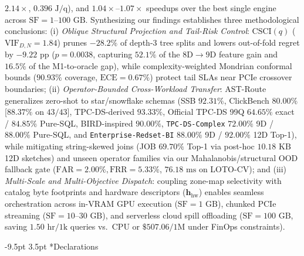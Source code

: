 \documentclass[10pt,a4paper]{article}
\makeatletter
\renewcommand\section{\@startsection{section}{1}{\z@}%
  {-9.5pt \@plus -2pt \@minus -1.5pt}%
  {3.5pt \@plus 1pt}%
  {\normalfont\large\bfseries}}
\makeatother
\begin{document}
$2.14\times$, $0.396\text{ J/q}$), and $1.04\times\text{--}1.07\times$ speedups over the best single engine across $\text{SF}=1\text{--}100\text{ GB}$. Synthesizing our findings establishes three methodological conclusions: (i) \textit{Oblique Structural Projection and Tail-Risk Control}: $\text{CSCI}(q)$ ($\text{VIF}_{D,N}=1.84$) prunes $-28.2\%$ of depth-3 tree splits and lowers out-of-fold regret by $-9.22\text{ pp}$ ($p=0.0038$, capturing $52.1\%$ of the $8\text{D}\rightarrow 9\text{D}$ feature gain and $16.5\%$ of the M1-to-oracle gap), while complexity-weighted Mondrian conformal bounds ($90.93\%$ coverage, $\text{ECE}=0.67\%$) protect tail SLAs near PCIe crossover boundaries; (ii) \textit{Operator-Bounded Cross-Workload Transfer}: AST-Route generalizes zero-shot to star/snowflake schemas (SSB $92.31\%$, ClickBench $80.00\%$ [$88.37\%$ on $43/43$], TPC-DS-derived $93.33\%$, Official TPC-DS 99Q $64.65\%$ exact / $84.85\%$ Pure-SQL, BIRD-inspired $90.00\%$, \texttt{TPC-DS-Complex} $72.00\%$ 9D / $88.00\%$ Pure-SQL, and \texttt{Enterprise-Redset-BI} $88.00\%$ 9D / $92.00\%$ 12D Top-1), while mitigating string-skewed joins (JOB $69.70\%$ Top-1 via post-hoc $10.18\text{ KB}$ 12D sketches) and unseen operator families via our Mahalanobis/structural OOD fallback gate ($\text{FAR}=2.00\%, \text{FRR}=5.33\%$, $76.18\text{ ms}$ on LOTO-CV); and (iii) \textit{Multi-Scale and Multi-Objective Dispatch}: coupling zone-map selectivity with catalog byte footprints and hardware descriptors ($\mathbf{h}_{\text{hw}}$) enables seamless orchestration across in-VRAM GPU execution ($\text{SF}=1\text{ GB}$), chunked PCIe streaming ($\text{SF}=10\text{--}30\text{ GB}$), and serverless cloud spill offloading ($\text{SF}=100\text{ GB}$, saving $1.50\text{ hr}/1\text{k}$ queries vs.\ CPU or $\$507.06/1\text{M}$ under FinOps constraints).

\vspace{-8pt}
\section*{Declarations}
\enlargethispage{1.8\baselineskip}
\vspace{-5pt}
\end{document}
